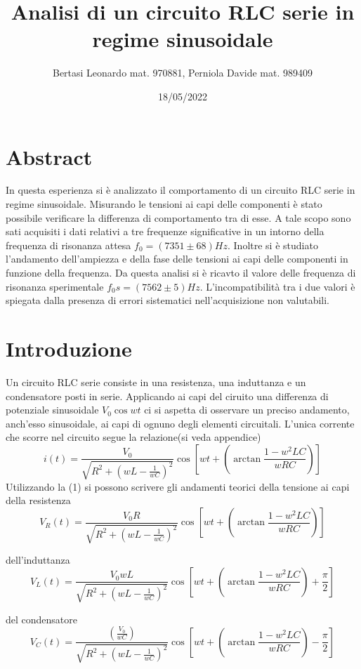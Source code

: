 \documentclass{article}
\title{Analisi di un circuito RLC serie in regime sinusoidale}
\date{18/05/2022}
\author{Bertasi Leonardo mat. 970881, Perniola Davide mat. 989409}
\begin{document}
\maketitle
\section{Abstract} 
In questa esperienza si è analizzato il comportamento di un circuito RLC serie in regime sinusoidale. Misurando le tensioni ai capi delle componenti è stato possibile
verificare la differenza di comportamento tra di esse. A tale scopo sono sati acquisiti i dati relativi a tre frequenze significative in un intorno della frequenza di risonanza attesa $f_0=(7351\pm68)Hz$.
Inoltre si è studiato l'andamento dell'ampiezza e della fase delle tensioni ai capi delle componenti in funzione della frequenza. Da questa analisi si è ricavto il valore delle frequenza di risonanza sperimentale $f_0s=(7562\pm5)Hz$.
L'incompatibilità tra i due valori è spiegata dalla presenza di errori sistematici nell'acquisizione non valutabili. 


\section{Introduzione} 
Un circuito RLC serie consiste in una resistenza, una induttanza e un condensatore posti in serie. Applicando ai capi del ciruito una differenza di potenziale sinusoidale $V_{0}\cos{wt} $ ci si aspetta di osservare un preciso andamento, anch'esso sinusoidale,
 ai capi di ognuno degli elementi circuitali. L'unica corrente che scorre nel circuito segue la relazione(si veda appendice) 
\begin{equation}
  i(t)=\frac{V_{0}}{\sqrt{R^2+(wL-\frac{1}{wC})^2}}\cos{[wt+(\arctan{\frac{1-w^2LC}{wRC}})]}
\end{equation}
Utilizzando la (1) si possono scrivere gli andamenti teorici della tensione ai capi della resistenza
\begin{equation}
 V_{R}(t)= \frac{V_{0}R}{\sqrt{R^2+(wL-\frac{1}{wC})^2}}\cos{[wt+(\arctan{\frac{1-w^2LC}{wRC}})]}
\end{equation}

dell'induttanza
\begin{equation}
  V_{L}(t)=\frac{V_{0}wL}{\sqrt{R^2+(wL-\frac{1}{wC})^2}}\cos{[wt+(\arctan{\frac{1-w^2LC}{wRC}})+\frac{\pi}{2}]}
\end{equation}

del condensatore
\begin{equation}
  V_{C}(t)=\frac{(\frac{V_{0}}{wC})}{\sqrt{R^2+(wL-\frac{1}{wC})^2}}\cos{[wt+(\arctan{\frac{1-w^2LC}{wRC}})-\frac{\pi}{2}]}
\end{equation} 
\end{document}
